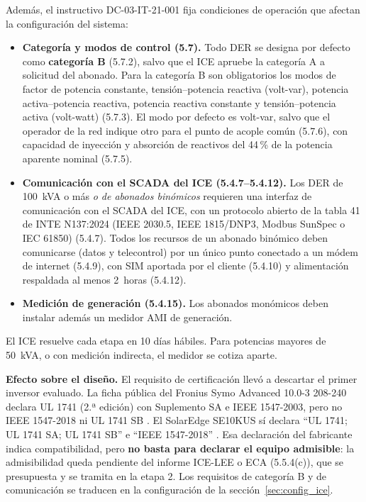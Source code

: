 \documentclass[12pt]{article}
\begin{document}
Además, el instructivo DC-03-IT-21-001 \cite{iceIT} fija condiciones de operación que afectan la configuración del sistema:
\begin{itemize}
\item \textbf{Categoría y modos de control (5.7).} Todo DER se designa por defecto como \textbf{categoría B} (5.7.2), salvo que el ICE apruebe la categoría A a solicitud del abonado. Para la categoría B son obligatorios los modos de factor de potencia constante, tensión--potencia reactiva (volt-var), potencia activa--potencia reactiva, potencia reactiva constante y tensión--potencia activa (volt-watt) (5.7.3). El modo por defecto es volt-var, salvo que el operador de la red indique otro para el punto de acople común (5.7.6), con capacidad de inyección y absorción de reactivos del 44\,\% de la potencia aparente nominal (5.7.5).
\item \textbf{Comunicación con el SCADA del ICE (5.4.7--5.4.12).} Los DER de 100~kVA o más \emph{o de abonados binómicos} requieren una interfaz de comunicación con el SCADA del ICE, con un protocolo abierto de la tabla 41 de INTE N137:2024 (IEEE 2030.5, IEEE 1815/DNP3, Modbus SunSpec o IEC 61850) (5.4.7). Todos los recursos de un abonado binómico deben comunicarse (datos y telecontrol) por un único punto conectado a un módem de internet (5.4.9), con SIM aportada por el cliente (5.4.10) y alimentación respaldada al menos 2~horas (5.4.12).
\item \textbf{Medición de generación (5.4.15).} Los abonados monómicos deben instalar además un medidor AMI de generación.
\end{itemize}

El ICE resuelve cada etapa en 10 días hábiles. Para potencias mayores de 50~kVA, o con medición indirecta, el medidor se cotiza aparte.

\textbf{Efecto sobre el diseño.} El requisito de certificación llevó a descartar el primer inversor evaluado. La ficha pública del Fronius Symo Advanced 10.0-3 208-240 declara UL 1741 (2.ª edición) con Suplemento SA e IEEE 1547-2003, pero no IEEE 1547-2018 ni UL 1741 SB \cite{fronius}. El SolarEdge SE10KUS sí declara ``UL 1741; UL 1741 SA; UL 1741 SB'' e ``IEEE 1547-2018'' \cite{seInv}. Esa declaración del fabricante indica compatibilidad, pero \textbf{no basta para declarar el equipo admisible}: la admisibilidad queda pendiente del informe ICE-LEE o ECA (5.5.4(c)), que se presupuesta y se tramita en la etapa 2. Los requisitos de categoría B y de comunicación se traducen en la configuración de la sección~\ref{sec:config_ice}.
\end{document}
